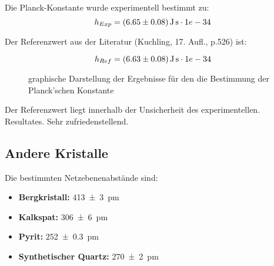 Die Planck-Konstante wurde experimentell bestimmt zu:
\begin{equation*}
    h_{Exp} = \SI{6.65 \pm 0.08}{\joule\second} \cdot 1e-34
\end{equation*}

Der Referenzwert aus der Literatur (Kuchling, 17. Aufl., p.526) ist:

\begin{equation*}
    h_{Ref} = \SI{6.63 \pm 0.08}{\joule\second} \cdot 1e-34
\end{equation*}

\vspace{-0.75em}
\pgfplotsset{try min ticks = 2}
\begin{figure}[ht!]
    \centering
    \caption{graphische Darstellung der Ergebnisse f\"ur den die Bestimmung der Planck'schen Konstante}
    \label{fig:resultsPlanck}
\end{figure}

Der  Referenzwert  liegt  innerhalb   der  Unsicherheit  des  experimentellen.
Resultates. Sehr zufriedenstellend.

\clearpage
\subsection{Andere Kristalle}
\label{subsec:othercrystals}

Die bestimmten Netzebenenabst\"ande sind:

\begin{itemize}
    \item
        \textbf{Bergkristall:}          \SI{413 \pm 3}{\pico\meter}
    \item
        \textbf{Kalkspat:}              \SI{306 \pm 6}{\pico\meter}
    \item
        \textbf{Pyrit:}                 \SI{252 \pm 0.3}{\pico\meter}
    \item
        \textbf{Synthetischer Quartz:} \SI{270 \pm 2}{\pico\meter}
\end{itemize}

